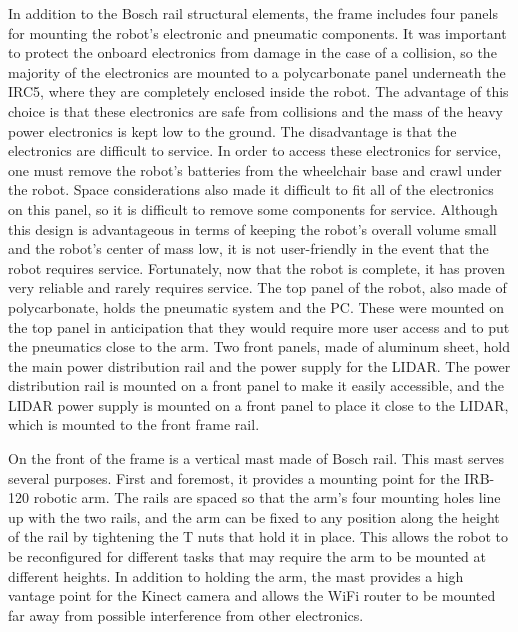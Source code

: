 \documentclass{article}
\begin{document}
In addition to the Bosch rail structural elements, the frame includes four panels for mounting the robot{\textquoteright}s electronic and pneumatic components. It was important to protect the onboard electronics from damage in the case of a collision, so the majority of the electronics are mounted to a polycarbonate panel underneath the IRC5, where they are completely enclosed inside the robot. The advantage of this choice is that these electronics are safe from collisions and the mass of the heavy power electronics is kept low to the ground. The disadvantage is that the electronics are difficult to service. In order to access these electronics for service, one must remove the robot{\textquoteright}s batteries from the wheelchair base and crawl under the robot. Space considerations also made it difficult to fit all of the electronics on this panel, so it is difficult to remove some components for service. Although this design is advantageous in terms of keeping the robot{\textquoteright}s overall volume small and the robot{\textquoteright}s center of mass low, it is not user-friendly in the event that the robot requires service. Fortunately, now that the robot is complete, it has proven very reliable and rarely requires service. The top panel of the robot, also made of polycarbonate, holds the pneumatic system and the PC. These were mounted on the top panel in anticipation that they would require more user access and to put the pneumatics close to the arm. Two front panels, made of aluminum sheet, hold the main power distribution rail and the power supply for the LIDAR. The power distribution rail is mounted on a front panel to make it easily accessible, and the LIDAR power supply is mounted on a front panel to place it close to the LIDAR, which is mounted to the front frame rail.

On the front of the frame is a vertical mast made of Bosch rail. This mast serves several purposes. First and foremost, it provides a mounting point for the IRB-120 robotic arm. The rails are spaced so that the arm{\textquoteright}s four mounting holes line up with the two rails, and the arm can be fixed to any position along the height of the rail by tightening the T nuts that hold it in place. This allows the robot to be reconfigured for different tasks that may require the arm to be mounted at different heights. In addition to holding the arm, the mast provides a high vantage point for the Kinect camera and allows the WiFi router to be mounted far away from possible interference from other electronics.
\end{document}
